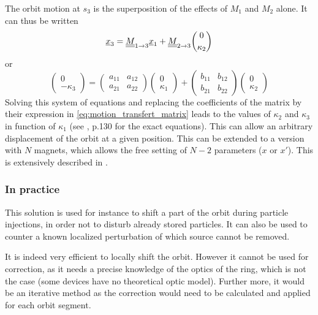 The orbit motion at $s_3$ is the superposition of the effects of $M_1$ and $M_2$ alone. It can thus be written
\begin{equation}
\underline{x}_3 = \underline{\underline{M}}_{1 \rightarrow 3} \underline{x}_1 + \underline{\underline{M}}_{2 \rightarrow 3} \dbinom{0}{\kappa_2}
\end{equation}
or
\begin{equation*}
\begin{pmatrix} 0 \\ -\kappa_3 \end{pmatrix} =
\begin{pmatrix} a_{11} & a_{12} \\ a_{21} & a_{22} \end{pmatrix} \begin{pmatrix} 0 \\ \kappa_1 \end{pmatrix} +
\begin{pmatrix} b_{11} & b_{12} \\ b_{21} & b_{22} \end{pmatrix} \begin{pmatrix} 0 \\ \kappa_2 \end{pmatrix}
\end{equation*}
Solving this system of equations and replacing the coefficients of the matrix by their expression in \cref{eq:motion_transfert_matrix} leads to the values of $\kappa_2$ and $\kappa_3$ in function of $\kappa_1$ (see \cite{book:wille}, p.130 for the exact equations). This can allow an arbitrary displacement of the orbit at a given position. This can be extended to a version with $N$ magnets, which allows the free setting of $N-2$ parameters ($x$ or $x'$). This is extensively described in \cite{book:wille}.

\subsubsection{In practice}
This solution is used for instance to shift a part of the orbit during particle injections, in order not to disturb already stored particles. It can also be used to counter a known localized perturbation of which source cannot be removed.

It is indeed very efficient to locally shift the orbit. However it cannot be used for correction, as it needs a precise knowledge of the optics of the ring, which is not the case (some devices have no theoretical optic model). Further more, it would be an iterative method as the correction would need to be calculated and applied for each orbit segment.

